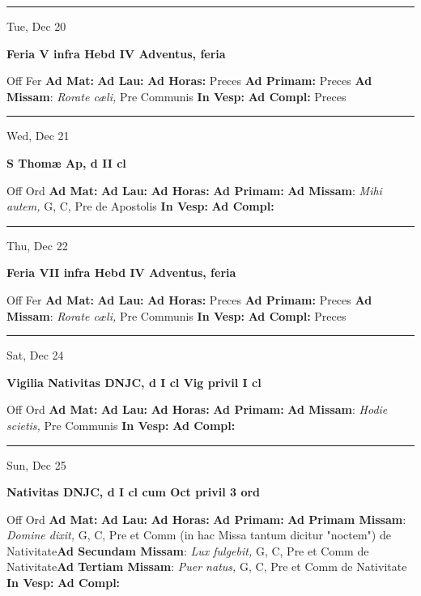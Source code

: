 \documentclass[letterpaper, 10pt]{article}
\begin{document}
\hrule
\begin{center}
Tue, Dec 20
\end{center}\textbf{ \large Feria V infra Hebd IV Adventus, \textnormal{\normalsize feria}}
\begin{justify}
Off Fer
\textbf{Ad Mat: }
\textbf{Ad Lau: }
\textbf{Ad Horas: }Preces
\textbf{Ad Primam: }Preces
\textbf{Ad Missam}: \textit{Rorate cæli,} Pre Communis
\textbf{In Vesp: }
\textbf{Ad Compl: }Preces\end{justify}



\hrule
\begin{center}
Wed, Dec 21
\end{center}\textbf{ \large S Thomæ Ap, \textnormal{\normalsize d II cl}}
\begin{justify}
Off Ord
\textbf{Ad Mat: }
\textbf{Ad Lau: }
\textbf{Ad Horas: }
\textbf{Ad Primam: }
\textbf{Ad Missam}: \textit{Mihi autem,} G, C, Pre de Apostolis
\textbf{In Vesp: }
\textbf{Ad Compl: }\end{justify}



\hrule
\begin{center}
Thu, Dec 22
\end{center}\textbf{ \large Feria VII infra Hebd IV Adventus, \textnormal{\normalsize feria}}
\begin{justify}
Off Fer
\textbf{Ad Mat: }
\textbf{Ad Lau: }
\textbf{Ad Horas: }Preces
\textbf{Ad Primam: }Preces
\textbf{Ad Missam}: \textit{Rorate cæli,} Pre Communis
\textbf{In Vesp: }
\textbf{Ad Compl: }Preces\end{justify}



\hrule
\begin{center}
Sat, Dec 24
\end{center}\textbf{ \large Vigilia Nativitas DNJC, \textnormal{\normalsize d I cl Vig privil I cl}}
\begin{justify}
Off Ord
\textbf{Ad Mat: }
\textbf{Ad Lau: }
\textbf{Ad Horas: }
\textbf{Ad Primam: }
\textbf{Ad Missam}: \textit{Hodie scietis,} Pre Communis
\textbf{In Vesp: }
\textbf{Ad Compl: }\end{justify}



\hrule
\begin{center}
Sun, Dec 25
\end{center}\textbf{ \large Nativitas DNJC, \textnormal{\normalsize d I cl cum Oct privil 3 ord}}
\begin{justify}
Off Ord
\textbf{Ad Mat: }
\textbf{Ad Lau: }
\textbf{Ad Horas: }
\textbf{Ad Primam: }
\textbf{Ad Primam Missam}: \textit{Domine dixit,} G, C, Pre et Comm (in hac Missa tantum dicitur "noctem") de Nativitate\textbf{Ad Secundam Missam}: \textit{Lux fulgebit,} G, C, Pre et Comm de Nativitate\textbf{Ad Tertiam Missam}: \textit{Puer natus,} G, C, Pre et Comm de Nativitate
\textbf{In Vesp: }
\textbf{Ad Compl: }\end{justify}
\end{document}
